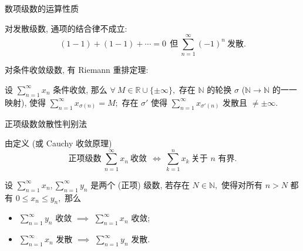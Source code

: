 
\begin{frame}{数项级数的运算性质}

对发散级数, 通项的结合律不成立:
\[(1 - 1) + (1 - 1) + \cdots = 0 ~~ \text{但} ~ \sum\limits_{n=1}^{\infty} (-1)^n ~ \text{发散.}\]

\pause
\vspace{1em}

对条件收敛级数, 有 Riemann 重排定理:
\begin{thm}
设 $\sum\limits_{n=1}^{\infty} x_n$ 条件收敛, 那么 $\forall~M \in \mathbb{R} \cup \{ \pm \infty \},$ 存在 $\mathbb{N}$ 的轮换 $\sigma$ ($\mathbb{N} \to \mathbb{N}$ 的一一映射), 使得 $\sum\limits_{n=1}^{\infty} x_{\sigma(n)} = M;$ 存在 $\sigma'$ 使得 $\sum\limits_{n=1}^{\infty} x_{\sigma'(n)}$ 发散且 $\neq \pm\infty.$
\end{thm}

\end{frame}


\begin{frame}{正项级数敛散性判别法}

由定义 (或 Cauchy 收敛原理)
\[\text{正项级数} ~ \sum\limits_{n=1}^{\infty} x_n ~ \text{收敛} ~~ \Longleftrightarrow ~ \sum\limits_{k=1}^{n} x_k ~ \text{关于 $n$ 有界}.\]

\pause

\begin{thm}[比较判别法]
设 $\sum\limits_{n=1}^{\infty} x_n, \sum\limits_{n=1}^{\infty} y_n$ 是两个 (正项) 级数, 若存在 $N \in \mathbb{N},$ 使得对所有 $n > N$ 都有 $0 \leqslant x_n \leqslant y_n,$ 那么
\begin{itemize}
\item $\sum\limits_{n=1}^{\infty} y_n$ 收敛 $\implies$ $\sum\limits_{n=1}^{\infty} x_n$ 收敛;
\item $\sum\limits_{n=1}^{\infty} x_n$ 发散 $\implies$ $\sum\limits_{n=1}^{\infty} y_n$ 发散.
\end{itemize}
\end{thm}

\end{frame}


